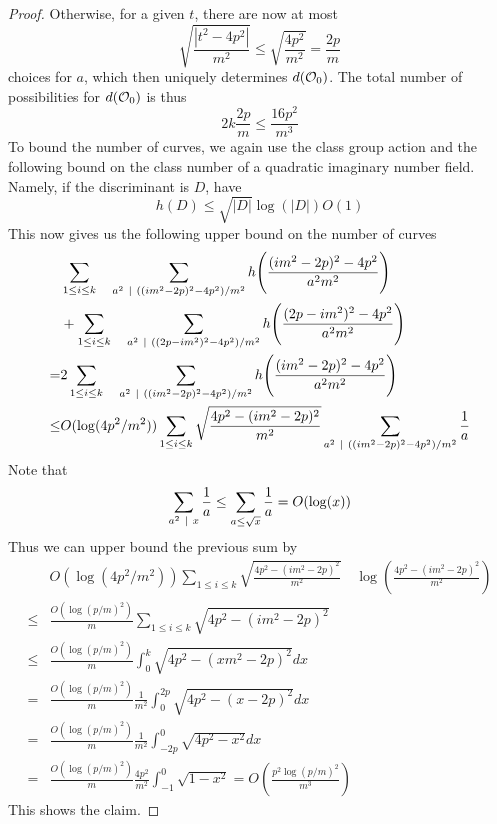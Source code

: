 \begin{proof}
    Otherwise, for a given $t$, there are now at most
    \begin{equation*}
        \sqrt{\frac {|t^2 - 4p^2|} {m^2}} \leq \sqrt{\frac {4p^2} {m^2}} = \frac {2p} m
    \end{equation*}
    choices for $a$, which then uniquely determines $d(\mathcal{O}_0)$.
    The total number of possibilities for $d(\mathcal{O}_0)$ is thus
    \begin{equation*}
        2k \frac {2p} {m} \leq \frac {16p^2} {m^3}
    \end{equation*}
    To bound the number of curves, we again use the class group action and the following bound on the class number of a quadratic imaginary number field.
    Namely, if the discriminant is $D$, have
    \begin{equation*}
        h(D) \leq \sqrt{|D|}\log(|D|) O(1)
    \end{equation*}
    This now gives us the following upper bound on the number of curves
    \begin{align*}
        &\sum_{1 \leq i \leq k} \quad \sum_{a^2 \ \mid \  ((im^2 - 2p)^2 - 4p^2)/m^2} h\Biggl( \frac {(im^2 - 2p)^2 - 4p^2} {a^2m^2} \Biggr) \\
        &+ \sum_{1 \leq i \leq k} \quad \sum_{a^2 \ \mid \  ((2p - im^2)^2 - 4p^2)/m^2} h\Biggl( \frac {(2p - im^2)^2 - 4p^2} {a^2m^2} \Biggr) \\
        =& 2\sum_{1 \leq i \leq k} \quad \sum_{a^2 \ \mid \  ((im^2 - 2p)^2 - 4p^2)/m^2} h\Biggl( \frac {(im^2 - 2p)^2 - 4p^2} {a^2m^2} \Biggr) \\
        \leq& O(\log(4p^2/m^2)) \sum_{1 \leq i \leq k} \sqrt{\frac {4p^2 - (im^2 - 2p)^2} {m^2}} \sum_{a^2 \ \mid \  ((im^2 - 2p)^2 - 4p^2)/m^2} \frac 1 a
    \end{align*}
    Note that
    \begin{align*}
        \sum_{a^2 \ \mid \  x} \frac 1 a \leq \sum_{a \leq \sqrt{x}} \frac 1 a = O(\log(x))
    \end{align*}
    Thus we can upper bound the previous sum by
    \begin{align*}
        &O(\log(4p^2/m^2)) \sum_{1 \leq i \leq k} \sqrt{ \frac {4p^2 - (im^2 - 2p)^2} {m^2}} \quad \log\left( \frac {4p^2 - (im^2 - 2p)^2} {m^2} \right) \\
        \leq& \frac {O(\log(p/m)^2)} {m} \sum_{1 \leq i \leq k} \sqrt{4p^2 - (im^2 - 2p)^2} \\
        \leq& \frac {O(\log(p/m)^2)} {m}  \int_0^k \sqrt{4p^2 - (xm^2 - 2p)^2} dx \\
        =& \frac {O(\log(p/m)^2)} {m} \frac 1 {m^2} \int_0^{2p} \sqrt{4p^2 - (x - 2p)^2} dx \\
        =& \frac {O(\log(p/m)^2)} {m} \frac 1 {m^2} \int_{-2p}^0 \sqrt{4p^2 - x^2} dx \\
        =& \frac {O(\log(p/m)^2)} {m} \frac {4p^2} {m^2} \int_{-1}^0 \sqrt{1 - x^2} = O\left( \frac {p^2\log(p/m)^2} {m^3} \right)
    \end{align*}
    This shows the claim.
\end{proof}
